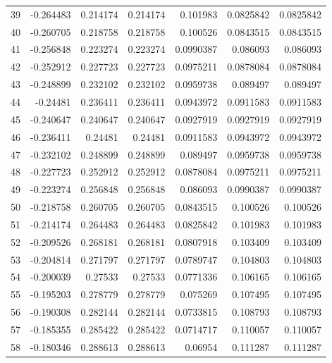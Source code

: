 \begin{tabular}{rrrrrrr}
  39 & -0.264483    & 0.214174    & 0.214174    &  0.101983    & 0.0825842   & 0.0825842   \\
  40 & -0.260705    & 0.218758    & 0.218758    &  0.100526    & 0.0843515   & 0.0843515   \\
  41 & -0.256848    & 0.223274    & 0.223274    &  0.0990387   & 0.086093    & 0.086093    \\
  42 & -0.252912    & 0.227723    & 0.227723    &  0.0975211   & 0.0878084   & 0.0878084   \\
  43 & -0.248899    & 0.232102    & 0.232102    &  0.0959738   & 0.089497    & 0.089497    \\
  44 & -0.24481     & 0.236411    & 0.236411    &  0.0943972   & 0.0911583   & 0.0911583   \\
  45 & -0.240647    & 0.240647    & 0.240647    &  0.0927919   & 0.0927919   & 0.0927919   \\
  46 & -0.236411    & 0.24481     & 0.24481     &  0.0911583   & 0.0943972   & 0.0943972   \\
  47 & -0.232102    & 0.248899    & 0.248899    &  0.089497    & 0.0959738   & 0.0959738   \\
  48 & -0.227723    & 0.252912    & 0.252912    &  0.0878084   & 0.0975211   & 0.0975211   \\
  49 & -0.223274    & 0.256848    & 0.256848    &  0.086093    & 0.0990387   & 0.0990387   \\
  50 & -0.218758    & 0.260705    & 0.260705    &  0.0843515   & 0.100526    & 0.100526    \\
  51 & -0.214174    & 0.264483    & 0.264483    &  0.0825842   & 0.101983    & 0.101983    \\
  52 & -0.209526    & 0.268181    & 0.268181    &  0.0807918   & 0.103409    & 0.103409    \\
  53 & -0.204814    & 0.271797    & 0.271797    &  0.0789747   & 0.104803    & 0.104803    \\
  54 & -0.200039    & 0.27533     & 0.27533     &  0.0771336   & 0.106165    & 0.106165    \\
  55 & -0.195203    & 0.278779    & 0.278779    &  0.075269    & 0.107495    & 0.107495    \\
  56 & -0.190308    & 0.282144    & 0.282144    &  0.0733815   & 0.108793    & 0.108793    \\
  57 & -0.185355    & 0.285422    & 0.285422    &  0.0714717   & 0.110057    & 0.110057    \\
  58 & -0.180346    & 0.288613    & 0.288613    &  0.06954     & 0.111287    & 0.111287    \\

\end{tabular}
